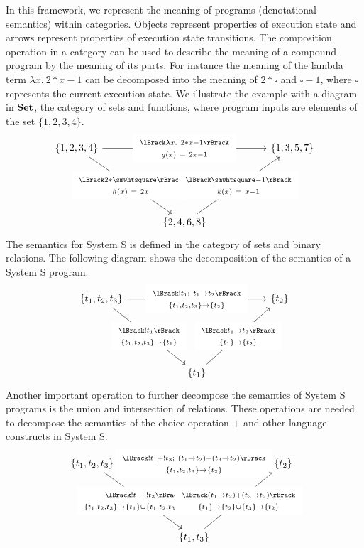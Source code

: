 \documentclass{article}
\begin{document}
In this framework, we represent the meaning of programs (denotational semantics) within categories. Objects represent properties of execution state and arrows represent properties of execution state transitions. The composition operation in a category can be used to describe the meaning of a compound program by the meaning of its parts. For instance the meaning of the lambda term $\lambda x.\ 2 * x - 1$ can be decomposed into the meaning of $2*\smwhtsquare$ and $\smwhtsquare - 1$, where $\smwhtsquare$ represents the current execution state. We illustrate the example with a diagram in $\mathbf{Set}$, the category of sets and functions, where program inputs are elements of the set $\{1,2,3,4\}$.
\[
\begin{tikzcd}[column sep=2cm,row sep=2cm]
  \{1,2,3,4\} \arrow{rr}[description]{\ontopof{\sem{\lambda x.\ 2* x -1}}{g(x)\ =\ 2x - 1}} \arrow{dr}[description]{\ontopof{\sem{2 * \smwhtsquare}}{h(x)\ =\ 2x}} & & \{1,3,5,7\} \\
  & \{2,4,6,8\} \arrow{ur}[description]{\ontopof{\sem{\smwhtsquare - 1}}{k(x)\ =\ x - 1}} &
\end{tikzcd}
\]
The semantics for System S is defined in the category of sets and binary relations. The following diagram shows the decomposition of the semantics of a System S program.
\[
\begin{tikzcd}[column sep=2cm,row sep=2cm]
  |[alias=A]| \{t_1,t_2,t_3\} \ar[rr,"\ontopof{\sem{!t_1;\ t_1 \rightarrow t_2}}{\sendto{t_1,t_2,t_3}{t_2}}"description] & & |[alias=B]| \{t_2\} \\
  & \{t_1\} \ar[from=A,"\ontopof{\sem{!t_1}}{\sendto{t_1,t_2,t_3}{t_1}}"description] \ar[to=B,"\ontopof{\sem{t_1 \rightarrow t_2}}{\sendto{t_1}{t_2}}"description] &
\end{tikzcd}
\]
Another important operation to further decompose the semantics of System S programs is the union and intersection of relations. These operations are needed to decompose the semantics of the choice operation $+$ and other language constructs in System S.
\[
\begin{tikzcd}[column sep=2cm,row sep=2cm]
  |[alias=A]| \{t_1,t_2,t_3\} \ar[rr,"\ontopof{\sem{!t_1 + !t_3;\ (t_1 \rightarrow t_2) + (t_3 \rightarrow t_2)}}{\sendto{t_1,t_2,t_3}{t_2}}"description] & & |[alias=B]| \{t_2\} \\
  & \{t_1,t_3\} \ar[from=A,"\ontopof{\sem{!t_1 + !t_3}}{\sendto{t_1,t_2,t_3}{t_1} \cup \sendto{t_1,t_2,t_3}{t_3}}"description] \ar[to=B,"\ontopof{\sem{(t_1 \rightarrow t_2) + (t_3 \rightarrow t_2)}}{\sendto{t_1}{t_2} \cup \sendto{t_3}{t_2}}"description] &
\end{tikzcd}
\]
\end{document}
